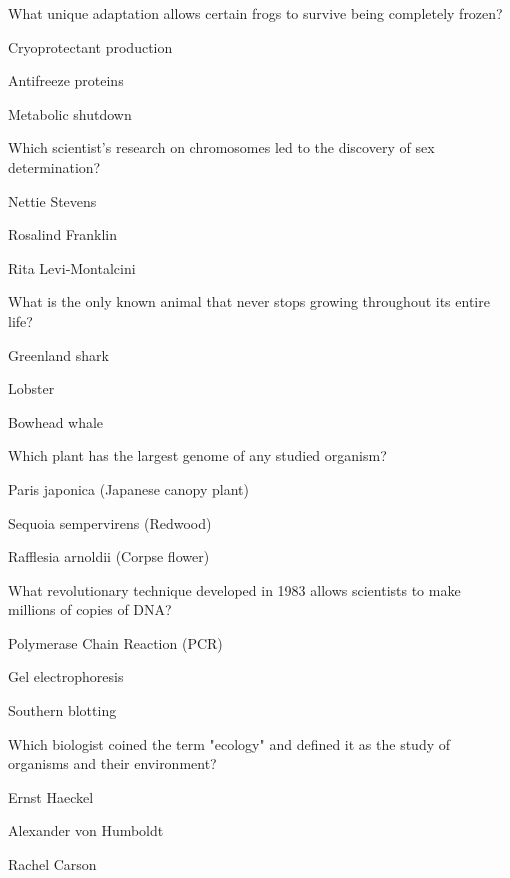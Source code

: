 \begin{enhancedmcq}{What unique adaptation allows certain frogs to survive being completely frozen?}
\item Cryoprotectant production
\item Antifreeze proteins
\item Metabolic shutdown

\end{enhancedmcq}
\begin{enhancedmcq}{Which scientist's research on chromosomes led to the discovery of sex determination?}
\item Nettie Stevens
\item Rosalind Franklin
\item Rita Levi‑Montalcini

\end{enhancedmcq}
\begin{enhancedmcq}{What is the only known animal that never stops growing throughout its entire life?}
\item Greenland shark
\item Lobster
\item Bowhead whale

\end{enhancedmcq}
\begin{enhancedmcq}{Which plant has the largest genome of any studied organism?}
\item Paris japonica (Japanese canopy plant)
\item Sequoia sempervirens (Redwood)
\item Rafflesia arnoldii (Corpse flower)

\end{enhancedmcq}
\begin{enhancedmcq}{What revolutionary technique developed in 1983 allows scientists to make millions of copies of DNA?}
\item Polymerase Chain Reaction (PCR)
\item Gel electrophoresis
\item Southern blotting

\end{enhancedmcq}
\begin{enhancedmcq}{Which biologist coined the term "ecology" and defined it as the study of organisms and their environment?}
\item Ernst Haeckel
\item Alexander von Humboldt
\item Rachel Carson

\end{enhancedmcq}
